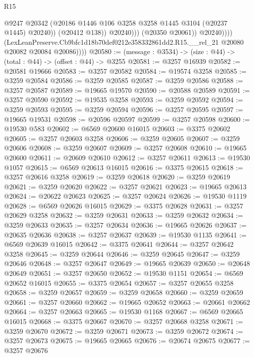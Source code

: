 \begin{lexlean}{R15}
\begin{coremodule}
                              @9247
                              @20342
                              (@20186 @1446 @106 @3258 @3258 @1445 @3104 (@20237 @1445) @20240))
                            (@20412 @138))
                          @20240)))
                    (@20350 @20061))
                  @20240))))
          (LexLeanPreserve.Cb9bfc1d18b70def0212e358332861dd2.R15.__rel_21
            @20080
            @20082
            @20084
            @20086))))
@20580 := (message : @3534) -> (size : @44) -> (total : @44) -> (offset : @44) -> @3255
@20581 := @3257 @16939
@20582 := @20581 @19666
@20583 := @3257 @20582
@20584 := @19574 @3258
@20585 := @3259 @20584
@20586 := @3259 @20585
@20587 := @3259 @20586
@20588 := @3257 @20587
@20589 := @19665 @19570
@20590 := @20588 @20589
@20591 := @3257 @20590
@20592 := @19535 @3258
@20593 := @3259 @20592
@20594 := @3259 @20593
@20595 := @3259 @20594
@20596 := @3257 @20595
@20597 := @19665 @19531
@20598 := @20596 @20597
@20599 := @3257 @20598
@20600 := @19530 @583
@20602 := @6569 @20600 @16015
@20603 := @3375 @20602
@20605 := @3257 @20603 @3258
@20606 := @3259 @20605
@20607 := @3259 @20606
@20608 := @3259 @20607
@20609 := @3257 @20608
@20610 := @19665 @20600
@20611 := @20609 @20610
@20612 := @3257 @20611
@20613 := @19530 @1057
@20615 := @6569 @20613 @16015
@20616 := @3375 @20615
@20618 := @3257 @20616 @3258
@20619 := @3259 @20618
@20620 := @3259 @20619
@20621 := @3259 @20620
@20622 := @3257 @20621
@20623 := @19665 @20613
@20624 := @20622 @20623
@20625 := @3257 @20624
@20626 := @19530 @1119
@20628 := @6569 @20626 @16015
@20629 := @3375 @20628
@20631 := @3257 @20629 @3258
@20632 := @3259 @20631
@20633 := @3259 @20632
@20634 := @3259 @20633
@20635 := @3257 @20634
@20636 := @19665 @20626
@20637 := @20635 @20636
@20638 := @3257 @20637
@20639 := @19530 @1135
@20641 := @6569 @20639 @16015
@20642 := @3375 @20641
@20644 := @3257 @20642 @3258
@20645 := @3259 @20644
@20646 := @3259 @20645
@20647 := @3259 @20646
@20648 := @3257 @20647
@20649 := @19665 @20639
@20650 := @20648 @20649
@20651 := @3257 @20650
@20652 := @19530 @1151
@20654 := @6569 @20652 @16015
@20655 := @3375 @20654
@20657 := @3257 @20655 @3258
@20658 := @3259 @20657
@20659 := @3259 @20658
@20660 := @3259 @20659
@20661 := @3257 @20660
@20662 := @19665 @20652
@20663 := @20661 @20662
@20664 := @3257 @20663
@20665 := @19530 @1168
@20667 := @6569 @20665 @16015
@20668 := @3375 @20667
@20670 := @3257 @20668 @3258
@20671 := @3259 @20670
@20672 := @3259 @20671
@20673 := @3259 @20672
@20674 := @3257 @20673
@20675 := @19665 @20665
@20676 := @20674 @20675
@20677 := @3257 @20676

\end{coremodule}
\end{lexlean}
